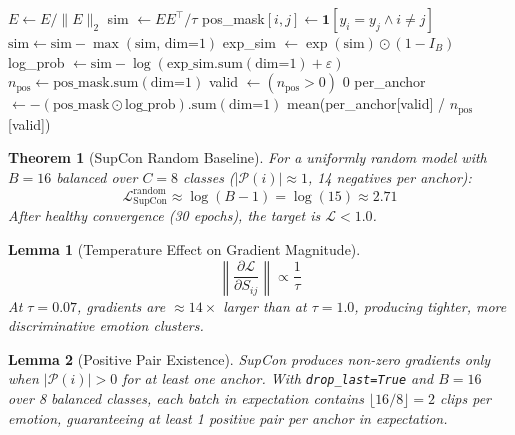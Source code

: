 \documentclass[12pt,a4paper]{article}
\theoremstyle{definition}
\theoremstyle{plain}
\newtheorem{theorem}{Theorem}[section]
\newtheorem{lemma}{Lemma}[section]
\theoremstyle{remark}
\begin{document}
\begin{algorithm}[H]
\caption{SupCon Loss Computation}
\label{alg:supcon}
\begin{algorithmic}[1]
\State $E \gets E / \|E\|_2$ 
\State sim $\gets E E^\top / \tau$ 
\State pos\_mask$[i,j] \gets \mathbf{1}[y_i{=}y_j \wedge i{\neq}j]$ 
\State $\text{sim} \gets \text{sim} - \max(\text{sim},\,\text{dim=1})$ 
\State exp\_sim $\gets \exp(\text{sim}) \odot (1-I_B)$ 
\State log\_prob $\gets \text{sim} - \log(\text{exp\_sim.sum}(\text{dim=1}) + \varepsilon)$ \Comment{$[B,B]$}
\State $n_{\text{pos}} \gets \text{pos\_mask.sum}(\text{dim=1})$ 
\State valid $\gets (n_{\text{pos}} > 0)$
 \Return $0$  \EndIf
\State per\_anchor $\gets -(\text{pos\_mask}\odot\text{log\_prob}).\text{sum}(\text{dim=1})$
\State \Return mean(per\_anchor[valid] / $n_{\text{pos}}$[valid])
\end{algorithmic}
\end{algorithm}

\begin{theorem}[SupCon Random Baseline]
\label{thm:random}
For a uniformly random model with $B=16$ balanced over $C=8$ classes
($|\mathcal{P}(i)|\approx 1$, 14 negatives per anchor):
\[
  \mathcal{L}_{\mathrm{SupCon}}^{\mathrm{random}} \approx \log(B-1) = \log(15) \approx 2.71
\]
After healthy convergence (30 epochs), the target is $\mathcal{L} < 1.0$.
\end{theorem}

\begin{lemma}[Temperature Effect on Gradient Magnitude]
\[
\left\|\frac{\partial\mathcal{L}}{\partial S_{ij}}\right\| \propto \frac{1}{\tau}
\]
At $\tau=0.07$, gradients are $\approx 14\times$ larger than at $\tau=1.0$,
producing tighter, more discriminative emotion clusters.
\end{lemma}

\begin{lemma}[Positive Pair Existence]
SupCon produces non-zero gradients only when $|\mathcal{P}(i)|>0$ for at least
one anchor.  With \texttt{drop\_last=True} and $B=16$ over 8 balanced classes,
each batch in expectation contains $\lfloor16/8\rfloor=2$ clips per emotion,
guaranteeing at least 1 positive pair per anchor in expectation.
\end{lemma}
\end{document}
